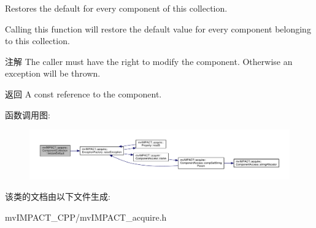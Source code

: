 Restores the default for every component of this collection. 

Calling this function will restore the default value for every component belonging to this collection.

\begin{DoxyNote}{注解}
The caller must have the right to modify the component. Otherwise an exception will be thrown.
\end{DoxyNote}
\begin{DoxyReturn}{返回}
A const reference to the component. 
\end{DoxyReturn}


函数调用图\+:
\nopagebreak
\begin{figure}[H]
\begin{center}
\leavevmode
\includegraphics[width=350pt]{classmv_i_m_p_a_c_t_1_1acquire_1_1_component_collection_a986cf6758394195fb4f47e8b5b9d0c8a_cgraph}
\end{center}
\end{figure}




该类的文档由以下文件生成\+:\begin{DoxyCompactItemize}
\item 
mv\+I\+M\+P\+A\+C\+T\+\_\+\+C\+P\+P/mv\+I\+M\+P\+A\+C\+T\+\_\+acquire.\+h\end{DoxyCompactItemize}
